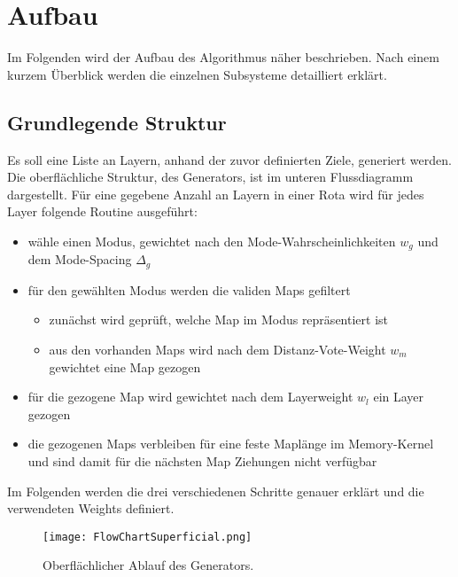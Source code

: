\section{Aufbau}
    Im Folgenden wird der Aufbau des Algorithmus näher beschrieben.
    Nach einem kurzem Überblick werden die einzelnen Subsysteme detailliert erklärt.
    \subsection{Grundlegende Struktur}

    Es soll eine Liste an Layern, anhand der zuvor definierten Ziele, generiert werden.
    Die oberflächliche Struktur, des Generators, ist im unteren Flussdiagramm dargestellt.
    Für eine gegebene Anzahl an Layern in einer Rota wird für jedes Layer folgende Routine ausgeführt:

    \begin{itemize}
        \item wähle einen Modus, gewichtet nach den Mode-Wahrscheinlichkeiten $w_g$ und dem Mode-Spacing $\Delta_g$
        \item für den gewählten Modus werden die validen Maps gefiltert
        \begin{itemize}
            \item zunächst wird geprüft, welche Map im Modus repräsentiert ist
            \item aus den vorhanden Maps wird nach dem Distanz-Vote-Weight $w_m$ gewichtet eine Map gezogen
        \end{itemize}
        \item für die gezogene Map wird gewichtet nach dem Layerweight $w_l$ ein Layer gezogen
        \item die gezogenen Maps verbleiben für eine feste Maplänge im Memory-Kernel und sind damit für die nächsten Map Ziehungen nicht verfügbar
    \end{itemize}
    Im Folgenden werden die drei verschiedenen Schritte genauer erklärt und die verwendeten Weights definiert.
    \begin{figure}[htbp]
        \centering
        \texttt{[image: FlowChartSuperficial.png]}
        \caption{Oberflächlicher Ablauf des Generators.}
    \end{figure}

